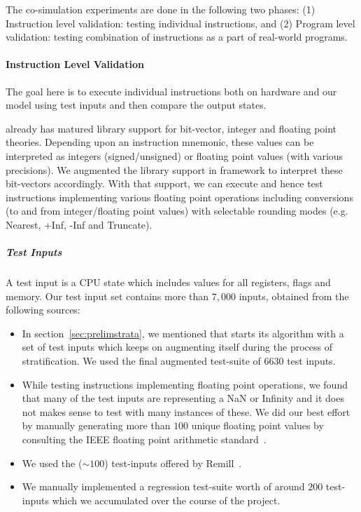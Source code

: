 The co-simulation experiments are done in the following two phases: (1) Instruction level validation: testing individual instructions, and (2) Program level validation: testing combination of instructions  as a part of real-world programs. 

\paragraph{Instruction Level Validation}
The goal here is to execute individual instructions both on hardware and our model using test inputs and then compare the output states. 

\K already has matured library support for bit-vector, integer and floating point theories.  Depending upon an instruction mnemonic, these values can be interpreted as integers (signed/unsigned) or floating point values (with various precisions).  We augmented the library support in \K framework to interpret these bit-vectors accordingly. With that support, we can execute and hence test instructions implementing various floating point operations including conversions (to and from integer/floating point values) with selectable rounding modes (e.g. Nearest, +Inf, -Inf and Truncate).   

\subparagraph{Test Inputs} %
A test input is a CPU state which includes values for all registers, flags and memory. Our test input set contains more than $7,000$ inputs, obtained from the following sources: 
\begin{itemize}
    \item In section~\ref{sec:prelimstrata}, we mentioned that \Strata starts its algorithm with a set of test inputs which keeps on augmenting itself during the process of stratification. We used the final augmented test-suite of  $6630$ test inputs.
    
    \item While testing instructions implementing floating point operations, we found that many of the test inputs are representing a NaN or Infinity and it does not makes sense to test with many instances of these. We did our best effort by manually generating more than $100$ unique floating point values by  consulting the IEEE floating point arithmetic standard~\cite{FP}.
    \item We used the (${\sim}100$) test-inputs offered by Remill~\cite{Remill}.
    \item We manually implemented a regression test-suite worth of around $200$ test-inputs which we accumulated over the course of the project. 
\end{itemize}  

